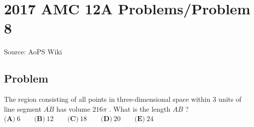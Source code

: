 \documentclass[12pt]{article}
\begin{document}
\section*{{2017 AMC 12A Problems/Problem 8}}
Source: AoPS Wiki

\subsection*{Problem}
The region consisting of all points in three-dimensional space within $3$ units of line segment $\overline{AB}$ has volume $216 \pi$ . What is the length $AB$ ? $\textbf{(A)}\ 6 \qquad\textbf{(B)}\ 12 \qquad\textbf{(C)}\ 18 \qquad\textbf{(D)}\ 20 \qquad\textbf{(E)}\ 24$
\end{document}

